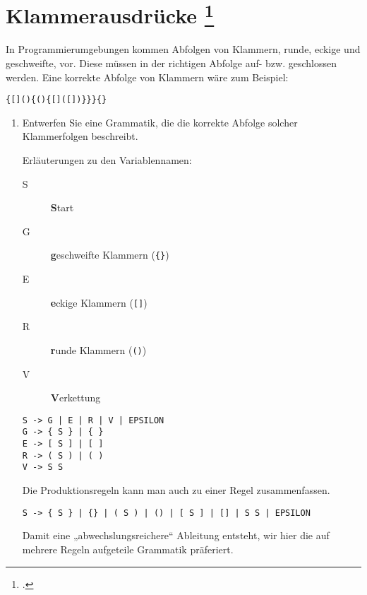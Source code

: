 \documentclass{lehramt-informatik-aufgabe}
\begin{document}
\section{Klammerausdrücke
\footcite{theo:ab:2}}

In Programmierumgebungen kommen Abfolgen von Klammern, runde, eckige und
geschweifte, vor. Diese müssen in der richtigen Abfolge auf- bzw.
geschlossen werden. Eine korrekte Abfolge von Klammern wäre zum
Beispiel:

\begin{verbatim}
{[](){(){[]([])}}}{}
\end{verbatim}

\begin{enumerate}


\item Entwerfen Sie eine Grammatik, die die korrekte Abfolge solcher
Klammerfolgen beschreibt.

\begin{liAntwort}
Erläuterungen zu den Variablennamen:

\begin{description}
\item[S] \textbf{S}tart

\item[G] \textbf{g}eschweifte Klammern (\texttt{\{\}})

\item[E] \textbf{e}ckige Klammern (\texttt{[]})

\item[R] \textbf{r}unde Klammern (\texttt{()})

\item[V] \textbf{V}erkettung
\end{description}

\begin{verbatim}
S -> G | E | R | V | EPSILON
G -> { S } | { }
E -> [ S ] | [ ]
R -> ( S ) | ( )
V -> S S
\end{verbatim}

Die Produktionsregeln kann man auch zu einer Regel zusammenfassen.

\begin{verbatim}
S -> { S } | {} | ( S ) | () | [ S ] | [] | S S | EPSILON
\end{verbatim}

Damit eine „abwechslungsreichere“ Ableitung entsteht, wir hier die auf
mehrere Regeln aufgeteile Grammatik präferiert.


\end{liAntwort}
\end{enumerate}
\end{document}
